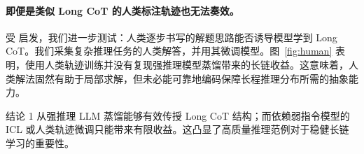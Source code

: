 \paragraph{\textbf{即便是类似 Long CoT 的人类标注轨迹也无法奏效。}}
受 \citet{du2025the} 启发，我们进一步测试：人类逐步书写的解题思路能否诱导模型学到 Long CoT。我们采集复杂推理任务的人类解答，并用其微调模型。图~\ref{fig:human} 表明，使用人类轨迹训练并没有复现强推理模型蒸馏带来的长链收益。这意味着，人类解法固然有助于局部求解，但未必能可靠地编码保障长程推理分布所需的抽象能力。

\begin{TakeawayBox}{结论 1}
从强推理 LLM 蒸馏能够有效传授 Long CoT 结构；而依赖弱指令模型的 ICL 或人类轨迹微调只能带来有限收益。这凸显了高质量推理范例对于稳健长链学习的重要性。
\end{TakeawayBox}
